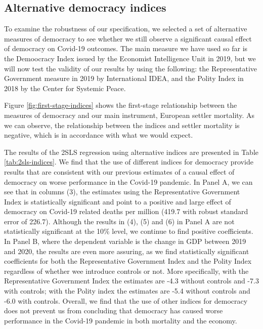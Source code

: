 
\subsection{Alternative democracy indices}

To examine the robustness of our specification, we selected a set of alternative measures of democracy to see whether we still observe a significant causal effect of democracy on Covid-19 outcomes. The main measure we have used so far is the Demoocracy Index issued by the Economist Intelligence Unit in 2019, but we will now test the validity of our results by using the following: the Representative Government measure in 2019 by International IDEA, and the Polity Index in 2018 by the Center for Systemic Peace. 

Figure \ref{fig:first-stage-indices} shows the first-stage relationship between the measures of democracy and our main instrument, European settler mortality. As we can observe, the relationship between the indices and settler mortality is negative, which is in accordance with what we would expect. 
    
The results of the 2SLS regression using alternative indices are presented in Table \ref{tab:2sls-indices}. We find that the use of different indices for democracy provide results that are consistent with our previous estimates of a causal effect of democracy on worse performance in the Covid-19 pandemic. In Panel A, we can see that in columns (3), the estimates using the Representative Government Index is statistically significant and point to a positive and large effect of democracy on Covid-19 related deaths per million (419.7 with robust standard error of 226.7). Although the results in (4), (5) and (6) in Panel A are not statistically significant at the 10\% level, we continue to find positive coefficients. In Panel B, where the dependent variable is the change in GDP between 2019 and 2020, the results are even more assuring, as we find statistically significant coefficients for both the Representative Government Index and the Polity Index regardless of whether wee introduce controls or not. More specifically, with the Representative Government Index the estimates are -4.3 without controls and -7.3 with controls; with the Polity index the estimates are -5.4 without controls and -6.0 with controls. Overall, we find that the use of other indices for democracy does not prevent us from concluding that democracy has caused worse performance in the Covid-19 pandemic in both mortality and the economy. 



